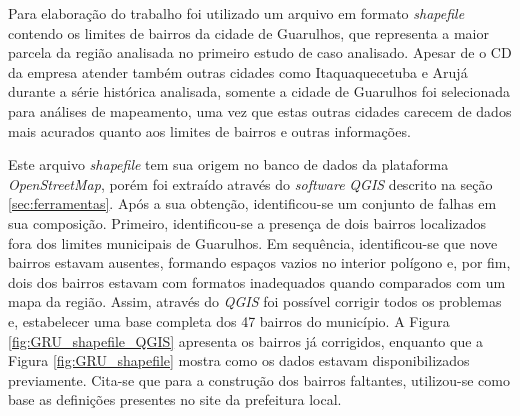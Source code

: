 Para elaboração do trabalho foi utilizado um arquivo em formato \textit{shapefile} contendo os limites de bairros da cidade de Guarulhos, que representa a maior parcela da região analisada no primeiro estudo de caso analisado.
%
Apesar de o CD da empresa atender também outras cidades como Itaquaquecetuba e Arujá durante a série histórica analisada, somente a cidade de Guarulhos foi selecionada para análises de mapeamento, uma vez que estas outras cidades carecem de dados mais acurados quanto aos limites de bairros e outras informações.

Este arquivo \textit{shapefile} tem sua origem no banco de dados da plataforma \textit{OpenStreetMap}, porém foi extraído através do \textit{software} \textit{QGIS} descrito na seção \ref{sec:ferramentas}. 
%
Após a sua obtenção, identificou-se um conjunto de falhas em sua composição.
%
Primeiro, identificou-se a presença de dois bairros localizados fora dos limites municipais de Guarulhos.
%
Em sequência, identificou-se que nove bairros estavam ausentes, formando espaços vazios no interior polígono e, por fim, dois dos bairros estavam com formatos inadequados quando comparados com um mapa da região.
%
Assim, através do \textit{QGIS} foi possível corrigir todos os problemas e, estabelecer uma base completa dos 47 bairros do município. 
%
A Figura \ref{fig:GRU_shapefile_QGIS} apresenta os bairros já corrigidos, enquanto que a Figura \ref{fig:GRU_shapefile} mostra como os dados estavam disponibilizados previamente.
%
Cita-se que para a construção dos bairros faltantes, utilizou-se como base as definições presentes no site da prefeitura local.

